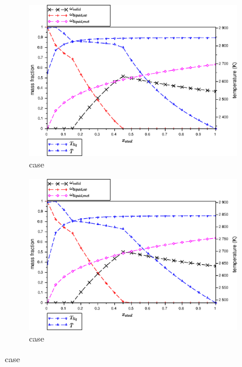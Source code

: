 \begin{figure}[H]
\\
\begin{subfigure}[t]{0.48\textwidth} 
 \centering \includegraphics[width=\textwidth]{figures/CalphadBasedEOSTest/OpenCalphad_NUCLEA9_scheilGulliver/C32_1850_x-T.eps} 
\caption{ case} \label{fig:x-T_C32_1850_OpenCalphad_NUCLEA9_scheilGulliver} 
\end{subfigure}
\hspace{0.01\textwidth}%
\begin{subfigure}[t]{0.48\textwidth} 
 \centering \includegraphics[width=\textwidth]{figures/CalphadBasedEOSTest/OpenCalphad_NUCLEA9_separatedLiquidEqs/C32_1850_x-T.eps} 
\caption{ case} \label{fig:x-T_C32_1850_OpenCalphad_NUCLEA9_separatedLiquidEqs} 

\end{subfigure}
\end{figure}
